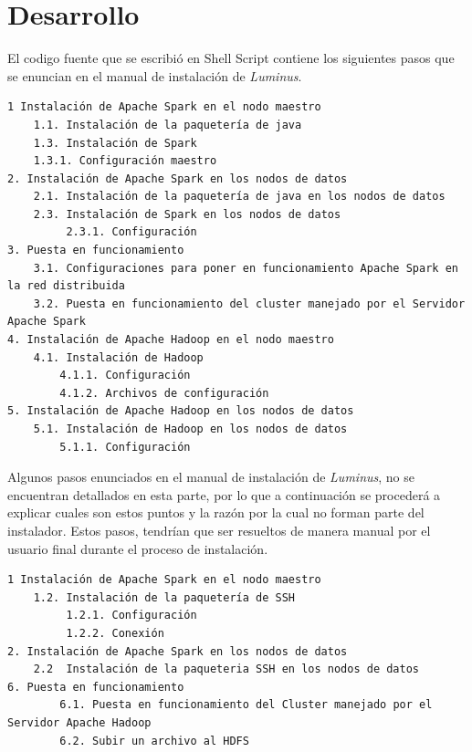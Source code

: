 \section{Desarrollo}\label{desarrollo}
El codigo fuente que se escribió en Shell Script contiene los siguientes pasos que se enuncian en el manual de instalación de \emph{Luminus}.
\begin{verbatim}
1 Instalación de Apache Spark en el nodo maestro
    1.1. Instalación de la paquetería de java 
    1.3. Instalación de Spark
    1.3.1. Configuración maestro
2. Instalación de Apache Spark en los nodos de datos
    2.1. Instalación de la paquetería de java en los nodos de datos
    2.3. Instalación de Spark en los nodos de datos
         2.3.1. Configuración 
3. Puesta en funcionamiento
    3.1. Configuraciones para poner en funcionamiento Apache Spark en la red distribuida
    3.2. Puesta en funcionamiento del cluster manejado por el Servidor Apache Spark
4. Instalación de Apache Hadoop en el nodo maestro
    4.1. Instalación de Hadoop 
        4.1.1. Configuración
        4.1.2. Archivos de configuración
5. Instalación de Apache Hadoop en los nodos de datos
    5.1. Instalación de Hadoop en los nodos de datos
        5.1.1. Configuración
\end{verbatim}
Algunos pasos enunciados en el manual de instalación de \emph{Luminus}, no se encuentran detallados en esta parte, por lo que a continuación se procederá a explicar cuales son estos puntos y la razón por la cual no forman parte del instalador.
Estos pasos, tendrían que ser resueltos de manera manual por el usuario final durante el proceso de instalación.
\begin{verbatim}
1 Instalación de Apache Spark en el nodo maestro
    1.2. Instalación de la paquetería de SSH
         1.2.1. Configuración
         1.2.2. Conexión
2. Instalación de Apache Spark en los nodos de datos         
    2.2  Instalación de la paqueteria SSH en los nodos de datos
6. Puesta en funcionamiento
		6.1. Puesta en funcionamiento del Cluster manejado por el Servidor Apache Hadoop
		6.2. Subir un archivo al HDFS
\end{verbatim}

